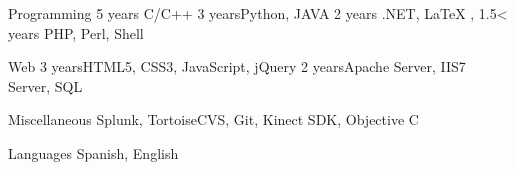 


\begin{cvskills}


\cvskill
{Programming} %
{5 years}{ C/C++} %
{3 years}{Python, JAVA} 
{2 years}{ .NET, LaTeX , } 
{1.5< years}{ PHP, Perl, Shell}


\cvskill
{Web} %
{3 years}{HTML5, CSS3, JavaScript, jQuery} 
{2 years}{Apache Server, IIS7 Server, SQL } 



\cvskill
{Miscellaneous} %
{Splunk, TortoiseCVS, Git, Kinect SDK, Objective C} 



\cvskill
{Languages} %
{Spanish, English} %


\end{cvskills}